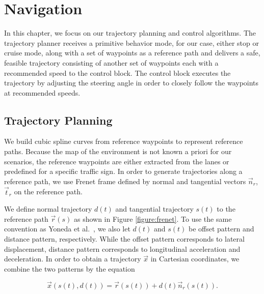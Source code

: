 \chapter{Navigation}
\label{chp:b5}

In this chapter, we focus on our trajectory planning and control algorithms.
The trajectory planner receives a primitive behavior mode, for our case, either
stop or cruise mode, along with a set of waypoints as a reference path and
delivers a safe, feasible trajectory consisting of another set of waypoints
each with a recommended speed to the control block. The control block executes
the trajectory by adjusting the steering angle in order to closely follow the
waypoints at recommended speeds.

\section{Trajectory Planning}

We build cubic spline curves from reference waypoints to represent reference
paths. Because the map of the environment is not known a priori for our
scenarios, the reference waypoints are either extracted from the lanes or
predefined for a specific traffic sign. In order to generate trajectories
along a reference path, we use Frenet frame \cite{Werling2010OptimalTG,
Yoneda2018TrajectoryOA} defined by normal and tangential vectors $\vec{n}_r$,
$\vec{t}_r$ on the reference path.

We define normal trajectory $d(t)$ and tangential trajectory $s(t)$ to the
reference path $\vec{r}(s)$ as shown in Figure \ref{figure:frenet}. To use the
same convention as Yoneda et al.\ \cite{Yoneda2018TrajectoryOA}, we also let
$d(t)$ and $s(t)$ be offset pattern and distance pattern, respectively. While
the offset pattern corresponds to lateral displacement, distance pattern
corresponds to longitudinal acceleration and deceleration. In order to obtain a
trajectory $\vec{x}$ in Cartesian coordinates, we combine the two patterns by
the equation

\begin{equation}
  \vec{x}(s(t), d(t)) = \vec{r}(s(t)) + d(t)\vec{n}_r(s(t)).
  \label{eq:trajectory}
\end{equation}

